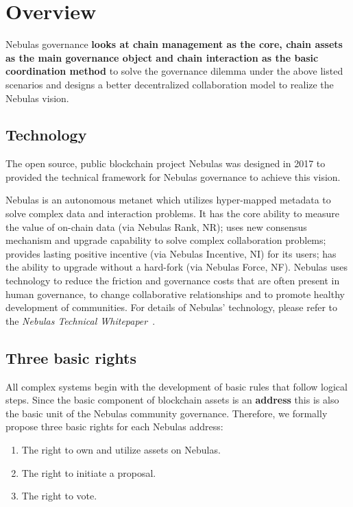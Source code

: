 \section{Overview}

Nebulas governance \textbf{looks at chain management as the core, chain assets as the main governance object and chain interaction as the basic coordination method} to solve the governance dilemma under the above listed scenarios and designs a better decentralized collaboration model to realize the Nebulas vision.

\subsection{Technology}

The open source, public blockchain project Nebulas was designed in 2017 to provided the technical framework for Nebulas governance to achieve this vision.

Nebulas is an autonomous metanet which utilizes hyper-mapped metadata to solve complex data and interaction problems. It has the core ability to measure the value of on-chain data (via Nebulas Rank, NR); uses new consensus mechanism and upgrade capability to solve complex collaboration problems; provides lasting positive incentive (via Nebulas Incentive, NI) for its users; has the ability to upgrade without a hard-fork (via Nebulas Force, NF). Nebulas uses technology to reduce the friction and governance costs that are often present in human governance, to change collaborative relationships and to promote healthy development of communities. For details of Nebulas' technology, please refer to the \textit{Nebulas Technical Whitepaper}~\cite{TechWhitepaper}.


\subsection{Three basic rights}
\label{rights}

All complex systems begin with the development of basic rules that follow logical steps. Since the basic component of blockchain assets is an \textbf{address} this is also the basic unit of the Nebulas community governance. Therefore, we formally propose three basic rights for each Nebulas address:

\begin{enumerate}
	\item The right to own and utilize assets on Nebulas.
	\item The right to initiate a proposal.
	\item The right to vote.
\end{enumerate}


